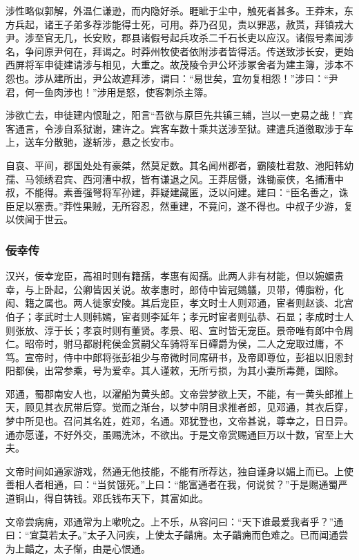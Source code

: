 \documentclass[]{article}
\begin{document}
涉性略似郭解，外温仁谦逊，而内隐好杀。睚眦于尘中，触死者甚多。王莽末，东方兵起，诸王子弟多荐涉能得士死，可用。莽乃召见，责以罪恶，赦贳，拜镇戎大尹。涉至官无几，长安败，郡县诸假号起兵攻杀二千石长吏以应汉。诸假号素闻涉名，争问原尹何在，拜谒之。时莽州牧使者依附涉者皆得活。传送致涉长安，更始西屏将军申徒建请涉与相见，大重之。故茂陵令尹公坏涉冢舍者为建主簿，涉本不怨也。涉从建所出，尹公故遮拜涉，谓曰：``易世矣，宜勿复相怨！''涉曰：``尹君，何一鱼肉涉也！''涉用是怒，使客刺杀主簿。

涉欲亡去，申徒建内恨耻之，阳言``吾欲与原巨先共镇三辅，岂以一吏易之哉！''宾客通言，令涉自系狱谢，建许之。宾客车数十乘共送涉至狱。建遣兵道徼取涉于车上，送车分散驰，遂斩涉，悬之长安市。

自哀、平间，郡国处处有豪桀，然莫足数。其名闻州郡者，霸陵杜君敖、池阳韩幼孺、马领绣君宾、西河漕中叔，皆有谦退之风。王莽居慑，诛锄豪侠，名捕漕中叔，不能得。素善强弩将军孙建，莽疑建藏匿，泛以问建。建曰：``臣名善之，诛臣足以塞责。''莽性果贼，无所容忍，然重建，不竟问，遂不得也。中叔子少游，复以侠闻于世云。

\hypertarget{header-n6134}{%
\subsubsection{佞幸传}\label{header-n6134}}

汉兴，佞幸宠臣，高祖时则有籍孺，孝惠有闳孺。此两人非有材能，但以婉媚贵幸，与上卧起，公卿皆因关说。故孝惠时，郎侍中皆冠鵕鸃，贝带，傅脂粉，化闳、籍之属也。两人徙家安陵。其后宠臣，孝文时士人则邓通，宦者则赵谈、北宫伯子；孝武时士人则韩嫣，宦者则李延年；孝元时宦者则弘恭、石显；孝成时士人则张放、淳于长；孝哀时则有董贤。孝景、昭、宣时皆无宠臣。景帝唯有郎中令周仁。昭帝时，驸马都尉秺侯金赏嗣父车骑将军日磾爵为侯，二人之宠取过庸，不笃。宣帝时，侍中中郎将张彭祖少与帝微时同席研书，及帝即尊位，彭祖以旧恩封阳都侯，出常参乘，号为爱幸。其人谨敕，无所亏损，为其小妻所毒薨，国除。

邓通，蜀郡南安人也，以濯船为黄头郎。文帝尝梦欲上天，不能，有一黄头郎推上天，顾见其衣尻带后穿。觉而之渐台，以梦中阴目求推者郎，见邓通，其衣后穿，梦中所见也。召问其名姓，姓邓，名通。邓犹登也，文帝甚说，尊幸之，日日异。通亦愿谨，不好外交，虽赐洗沐，不欲出。于是文帝赏赐通巨万以十数，官至上大夫。

文帝时间如通家游戏，然通无他技能，不能有所荐达，独自谨身以媚上而已。上使善相人者相通，曰：``当贫饿死。''上曰：``能富通者在我，何说贫？''于是赐通蜀严道铜山，得自铸钱。邓氏钱布天下，其富如此。

文帝尝病痈，邓通常为上嗽吮之。上不乐，从容问曰：``天下谁最爱我者乎？''通曰：``宜莫若太子。''太子入问疾，上使太子齰痈。太子齰痈而色难之。已而闻通尝为上齰之，太子惭，由是心恨通。
\end{document}
